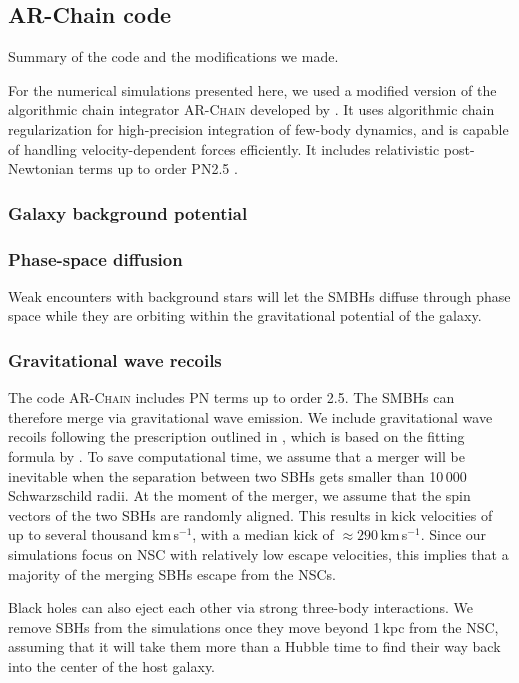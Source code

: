 \documentclass[english, apj]{emulateapj}
\begin{document}
\subsection{AR-Chain code}
Summary of the code and the modifications we made.

For the numerical simulations presented here, we used a modified version of the algorithmic chain integrator \textsc{AR-Chain} developed by \citet{2006MNRAS.372..219M}. It uses algorithmic chain regularization for high-precision integration of few-body dynamics, and is capable of handling velocity-dependent forces efficiently. It includes relativistic post-Newtonian terms up to order PN2.5 \citep{2008AJ....135.2398M}.


\subsubsection{Galaxy background potential}

\subsubsection{Phase-space diffusion}
Weak encounters with background stars will let the SMBHs diffuse through phase space while they are orbiting within the gravitational potential of the galaxy.

\subsubsection{Gravitational wave recoils}
The code \textsc{AR-Chain} includes PN terms up to order 2.5. The SMBHs can therefore merge via gravitational wave emission. We include gravitational wave recoils following the prescription outlined in \citet{2015ApJ...799..178K}, which is based on the fitting formula by \citet{2012PhRvD..85h4015L}. To save computational time, we assume that a merger will be inevitable when the separation between two SBHs gets smaller than 10\,000 Schwarzschild radii. At the moment of the merger, we assume that the spin vectors of the two SBHs are randomly aligned. This results in kick velocities of up to several thousand km\,s$^{-1}$, with a median kick of $\approx 290$\,km\,s$^{-1}$. Since our simulations focus on NSC with relatively low escape velocities, this implies that a majority of the merging SBHs escape from the NSCs. 

Black holes can also eject each other via strong three-body interactions. We remove SBHs from the simulations once they move beyond 1\,kpc from the NSC, assuming that it will take them more than a Hubble time to find their way back into the center of the host galaxy.
\end{document}
